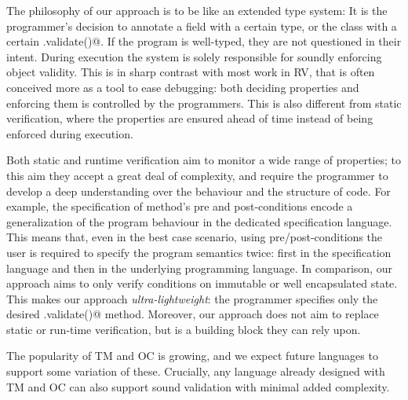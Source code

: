 
\loseSpace
The philosophy of our approach is to be like an extended type system: 
It is the programmer's decision
to annotate a field with a certain type,
or the class with a certain \Q@.validate()@.
If the program is well-typed, they are not questioned in their intent.
During execution the system is solely responsible for soundly enforcing object validity.
This is in sharp contrast with most work in RV, that is often conceived more as a tool to ease debugging:
both deciding properties and enforcing them is controlled by the programmers.
This is also different from static verification,
where the properties are ensured ahead of time instead of being enforced during execution.

Both static and runtime verification
aim to monitor a wide range of properties; to this aim they accept a 
great deal of complexity, and require the programmer to develop a deep understanding
over the behaviour and the structure of code.
For example, the specification of method’s pre and post-conditions
encode a generalization of the program behaviour in the dedicated specification language.
This means that, even in the best case scenario, 
using pre/post-conditions the user is required to specify the program semantics twice:
first in the specification language and then in the underlying programming language.
In comparison, our approach aims to only verify conditions on immutable or well encapsulated state.
This makes our approach \emph{ultra-lightweight}:
the programmer specifies only the desired \Q@.validate()@ method.
Moreover, our approach does not aim to replace static or run-time verification,
but is a building block they can rely upon.

The popularity of TM and OC is growing, and we expect future languages to support some variation of these.
Crucially, any language already designed with TM and OC
can also support sound validation with minimal added complexity.